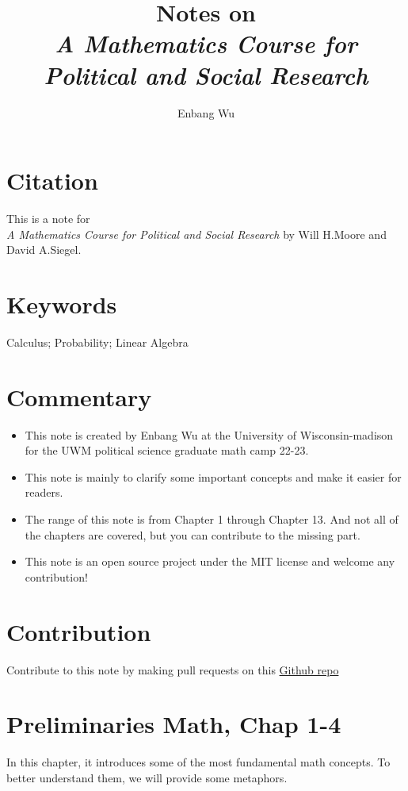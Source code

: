 \documentclass{article}
\title{Notes on \\ \textit{A Mathematics Course for Political and Social Research}}
\author{Enbang Wu}
\begin{document}
\maketitle

\section{Citation}
This is a note for \\ \textit{A Mathematics Course for Political and Social Research} by Will H.Moore and David A.Siegel.

\section{Keywords}
Calculus; Probability; Linear Algebra


\section{Commentary}
\begin{itemize}
    \item This note is created by Enbang Wu at the University of Wisconsin-madison for the UWM political science graduate math camp 22-23.
    \item This note is mainly to clarify some important concepts and make it easier for readers.
    \item The range of this note is from Chapter 1 through Chapter 13. And not all of the chapters are covered, but you can contribute to the missing part.
    \item This note is an open source project under the MIT license and welcome any contribution!
\end{itemize}

\section{Contribution}
Contribute to this note by making pull requests on this \hyperlink{https://github.com/EnbangWu/Notes-on-Math4PS}{Github repo}

\newpage
\tableofcontents
\newpage

\section{Preliminaries Math, Chap 1-4}
In this chapter, it introduces some of the most fundamental math concepts. To better understand them, we will provide some metaphors.
\end{document}
